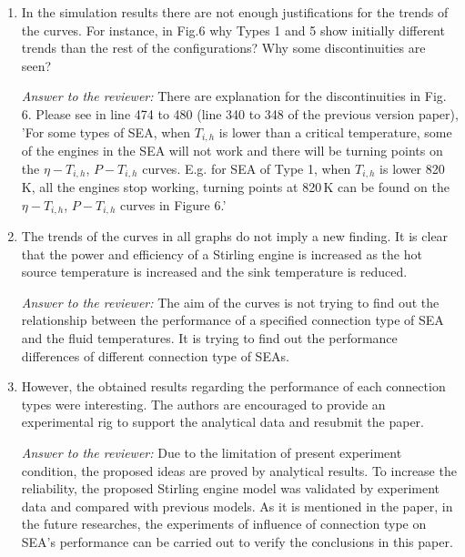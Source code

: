 \documentclass[12pt]{letter}
\begin{document}
\begin{enumerate}
\item In the simulation results there are not enough justifications for the trends of the curves. For instance, in Fig.6 why Types 1 and 5 show initially different trends than the rest of the configurations? Why some discontinuities are seen?

\begin{snugshade*}
\emph{Answer to the reviewer:} 
There are explanation for the discontinuities in Fig. 6. Please see in line 474 to 480 (line 340 to 348 of the previous version paper), 'For some types of SEA, when $T_{i,h}$ is lower than a critical temperature, some of the engines in the SEA will not work and there will be turning points on the $\eta-T_{i,h}$, $P-T_{i,h}$ curves. E.g. for SEA of Type 1, when $T_{i,h}$ is lower 820\,K, all the engines stop working, turning points at 820\,K can be found on the $\eta-T_{i,h}$, $P-T_{i,h}$ curves in Figure 6.'
\end{snugshade*}

\item The trends of the curves in all graphs do not imply a new finding. It is clear that the power and efficiency of a Stirling engine is increased as the hot source temperature is increased and the sink temperature is reduced.

\begin{snugshade*}
\emph{Answer to the reviewer:} 
The aim of the curves is not trying to find out the relationship between the performance of a specified connection type of SEA and the fluid temperatures. It is trying to find out the performance differences of different connection type of SEAs.
\end{snugshade*}

\item However, the obtained results regarding the performance of each connection types were interesting. The authors are encouraged to provide an experimental rig to support the analytical data and resubmit the paper. 

\begin{snugshade*}
\emph{Answer to the reviewer:} 
Due to the limitation of present experiment condition, the proposed ideas are proved by analytical results. To increase the reliability, the proposed Stirling engine model was validated by experiment data and compared with previous models. As it is mentioned in the paper, in the future researches, the experiments of influence of connection type on SEA’s performance can be carried out to verify the conclusions in this paper.
\end{snugshade*}

\end{enumerate}
\end{document}
